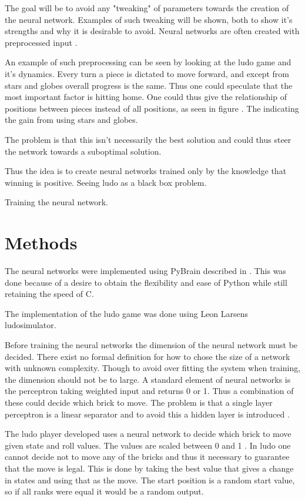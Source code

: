 \documentclass{llncs}
\begin{document}
The goal will be to avoid any "tweaking" of parameters towards the creation of the neural network. Examples of such tweaking will be shown, both to show it's strengths and why it is desirable to avoid. Neural networks are often created with preprocessed input \cite{NeuronOnline}. 

An example of such preprocessing can be seen by looking at the ludo game and it's dynamics. Every turn a piece is dictated to move forward, and except from stars and globes overall progress is the same. Thus one could speculate that the most important factor is hitting home. One could thus give the relationship  of positions between pieces instead of all positions, as seen in figure%
. The indicating the gain from using stars and globes.


The problem is that this isn't necessarily the best solution and could thus steer the network towards a suboptimal solution. 



Thus the idea is to create neural networks trained only by the knowledge that winning is positive. Seeing ludo as a black box problem.



Training the neural network.

\section*{Methods} %


The neural networks were implemented using PyBrain described in \cite{schaul2010}. This was done because of a desire to obtain the flexibility and ease of Python while still retaining the speed of C. 

The implementation of the ludo game was done using Leon Larsens ludosimulator.

Before training the neural networks the dimension of the neural network must be decided. There exist no formal definition for how to chose the size of a network with unknown complexity. Though to avoid over fitting the system when training, the dimension should not be to large. A standard element of neural networks is the perceptron taking weighted input and returns 0 or 1. Thus a combination of these could decide which brick to move. The problem is that a single layer perceptron is a linear separator and to avoid this a hidden layer is introduced \cite{Russell}.

The ludo player developed uses a neural network to decide which brick to move given state and roll values. The values are scaled between 0 and 1 . In ludo one cannot decide not to move any of the bricks and thus it necessary to guarantee that the move is legal. This is done by taking the best value that gives a change in states and using that as the move. The start position is a random start value, so if all ranks were equal it would be a random output.
\end{document}
